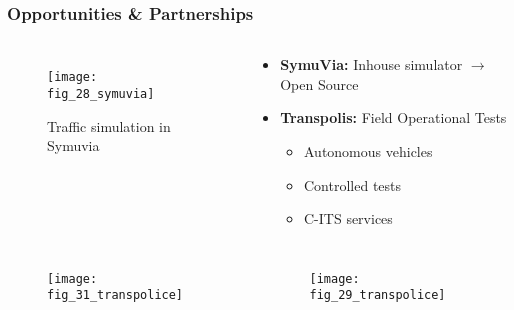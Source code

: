 \begin{frame}
\frametitle{Opportunities \& Partnerships}
    \begin{columns}
        \begin{figure}
        \centering
        \texttt{[image: fig\_28\_symuvia]}
        \caption{Traffic simulation in Symuvia}
        \end{figure}
        \begin{example}
        \begin{itemize}
            \item \textbf{SymuVia:} Inhouse simulator \(\rightarrow\)Open Source
            \item \textbf{Transpolis:} Field Operational Tests  
            \begin{itemize}
            \item Autonomous vehicles 
            \item Controlled tests 
            \item C-ITS services
            \end{itemize}
        \end{itemize}
        \end{example} 
    \end{columns}
    \begin{columns}
        \begin{figure}
        \centering
        \texttt{[image: fig\_31\_transpolice]}
        \end{figure}
        \begin{figure}
        \centering
        \texttt{[image: fig\_29\_transpolice]}
        \end{figure}    
    \end{columns}
\end{frame}